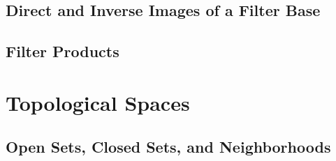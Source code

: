 \subsection{Direct and Inverse Images of a Filter Base}


\subsection{Filter Products}





\section{Topological Spaces}
\subsection{Open Sets, Closed Sets, and Neighborhoods}





















